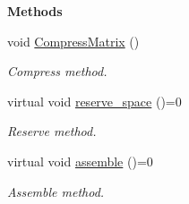 \begin{Indent}{\bf Methods}\par
\begin{DoxyCompactItemize}
\item 
void \hyperlink{classFVCode3D_1_1global__Operator_a75a401822402ed577b92da12d7fc64bf}{Compress\+Matrix} ()
\begin{DoxyCompactList}\small\item\em Compress method. \end{DoxyCompactList}\item 
virtual void \hyperlink{classFVCode3D_1_1global__Operator_adeaf69c5dbde01c928a38778f8628d16}{reserve\+\_\+space} ()=0
\begin{DoxyCompactList}\small\item\em Reserve method. \end{DoxyCompactList}\item 
virtual void \hyperlink{classFVCode3D_1_1global__Operator_ac69b44903c8f69655f26078246de6dc3}{assemble} ()=0
\begin{DoxyCompactList}\small\item\em Assemble method. \end{DoxyCompactList}\end{DoxyCompactItemize}
\end{Indent}
